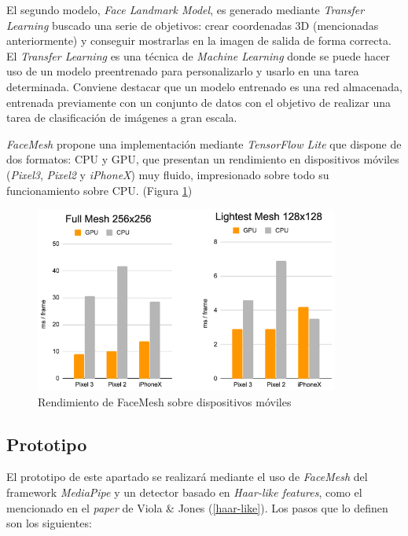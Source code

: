 El segundo modelo, \textit{Face Landmark Model}, es generado mediante \textit{Transfer Learning} buscado una serie de objetivos: crear coordenadas 3D (mencionadas anteriormente) y conseguir mostrarlas en la imagen de salida de forma correcta. \cite{faceMesh} El \textit{Transfer Learning} es una técnica de \textit{Machine Learning} donde se puede hacer uso de un modelo preentrenado para personalizarlo y usarlo en una tarea determinada. Conviene destacar que un modelo entrenado es una red almacenada, entrenada previamente con un conjunto de datos con el objetivo de realizar una tarea de clasificación de imágenes a gran escala. \cite{transferLearning}

\textit{FaceMesh} propone una implementación mediante \textit{TensorFlow Lite} que dispone de dos formatos: CPU y GPU, que presentan un rendimiento en dispositivos móviles (\textit{Pixel3}, \textit{Pixel2} y \textit{iPhoneX}) muy fluido, impresionado sobre todo su funcionamiento sobre CPU. (Figura \ref{fig:faceMeshRen}) \cite{faceMesh3}

\begin{figure}[htp]
	\centering
	\includegraphics[width=10cm]{imagenes/rendFaceMesh.png}
	\caption{Rendimiento de FaceMesh sobre dispositivos móviles}
	\label{fig:faceMeshRen}
\end{figure}


\subsection*{Prototipo}

El prototipo de este apartado se realizará mediante el uso de \textit{FaceMesh} del framework \textit{MediaPipe} y un detector basado en \textit{Haar-like features}, como el mencionado en el \textit{paper} de Viola \& Jones (\ref{haar-like}). Los pasos que lo definen son los siguientes:

